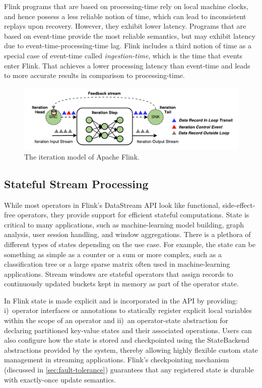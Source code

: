 \documentclass[11pt]{article}
\begin{document}
Flink programs that are based on processing-time rely on local machine clocks, and hence possess a less reliable notion of time, which can lead to inconsistent replays upon recovery. However, they exhibit lower latency. Programs that are based on event-time provide the most reliable semantics, but may exhibit latency due to event-time-processing-time lag. Flink includes a third notion of time as a special case of event-time called \emph{ingestion-time}, which is the time that events enter Flink. That achieves a lower processing latency than event-time and leads to more accurate results in comparison to processing-time.


\begin{figure}[t!]
  \centering
    \includegraphics[width=.75\textwidth,natwidth=498,natheight=145]{figs/iterations.pdf}
    \vspace{-6mm}
  \caption{The iteration model of Apache Flink.}
  \vspace{-2mm}
  \label{fig:iterations}
\end{figure}

\vspace{-3mm}
\subsection{Stateful Stream Processing}
\vspace{-2mm}
While most operators in Flink's DataStream API look like functional, side-effect-free operators, they provide support for efficient stateful computations. State is critical to many applications, such as machine-learning model building, graph analysis, user session handling, and window aggregations. There is a plethora of different types of states depending on the use case. For example, the state can be something as simple as a counter or a sum or more complex, such as a classification tree or a large sparse matrix often used in machine-learning applications. Stream windows are  stateful operators that assign records to continuously updated buckets kept in memory as part of the operator state. 

In Flink state is made explicit and is incorporated in the API by providing: i)~operator interfaces or annotations to statically register explicit local variables within the scope of an operator and  ii)~an operator-state abstraction for declaring partitioned key-value states and their associated operations. Users can also configure how the state is stored and checkpointed using the StateBackend abstractions provided by the system, thereby allowing highly flexible custom state management in streaming applications. Flink's checkpointing mechanism (discussed in \autoref{sec:fault-tolerance}) guarantees that any registered state is durable with exactly-once update semantics. 
\vspace{-8mm}
\end{document}
